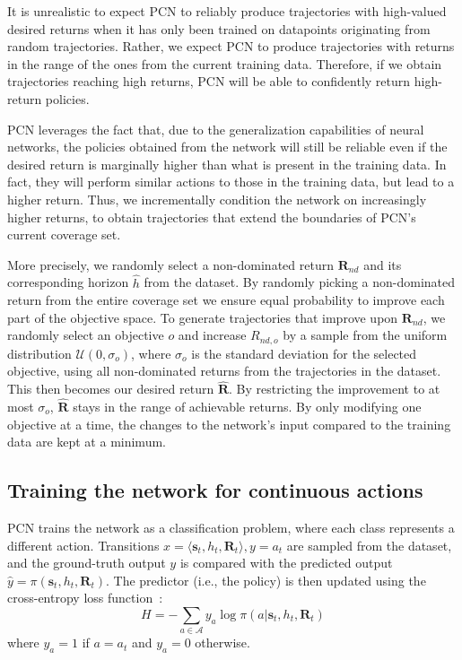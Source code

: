 \documentclass{article}
\renewcommand{\cite}[1]{\citep{#1}}
\newcommand{\mdpstate}{\mathbf{s}}
\newcommand{\momdpreturn}{\mathbf{R}}
\newcommand{\action}{a}
\begin{document}
It is unrealistic to expect PCN to reliably produce trajectories with high-valued desired returns when it has only been trained on datapoints originating from random trajectories. Rather, we expect PCN to produce trajectories with returns in the range of the ones from the current training data. Therefore, if we obtain trajectories reaching high returns, PCN will be able to confidently return high-return policies.

PCN leverages the fact that, due to the generalization capabilities of neural networks, the policies obtained from the network will still be reliable even if the desired return is marginally higher than what is present in the training data. In fact, they will perform similar actions to those in the training data, but lead to a higher return. Thus, we incrementally condition the network on increasingly higher returns, to obtain trajectories that extend the boundaries of PCN's current coverage set.

More precisely, we randomly select a non-dominated return $\mathbf{R}_{nd}$ and its corresponding horizon $\hat{h}$ from the dataset. By randomly picking a non-dominated return from the entire coverage set we ensure equal probability to improve each part of the objective space. To generate trajectories that improve upon $\mathbf{R}_{nd}$, we randomly select an objective $o$ and increase $R_{nd,o}$ by a sample from the uniform distribution $\mathcal{U}(0, \sigma_o)$, where $\sigma_o$ is the standard deviation for the selected objective, using all non-dominated returns from the trajectories in the dataset. This then becomes our desired return $\bm{\hat{R}}$. By restricting the improvement to at most $\sigma_o$, $\mathbf{\hat{R}}$ stays in the range of achievable returns. By only modifying one objective at a time, the changes to the network's input compared to the training data are kept at a minimum.

\subsection{Training the network for continuous actions}
\label{sec:pcn-continuous}

PCN trains the network as a classification problem, where each class represents a different action. Transitions $x= \langle \mdpstate_t, h_t, \momdpreturn_t \rangle, y=\action_t$ are sampled from the dataset, and the ground-truth output $y$ is compared with the predicted output $\hat{y}=\pi(\mdpstate_t, h_t, \momdpreturn_t)$. The predictor (i.e., the policy) is then updated using the cross-entropy loss function~\cite{shore1980axiomatic}:
\begin{equation}
    H = -\sum_{\action \in \mathcal{A}}{y_{\action} \log \pi(\action|\mdpstate_t,h_t,\momdpreturn_t)}
\end{equation}
where $y_\action = 1$ if $\action = \action_t$ and $y_\action = 0$ otherwise.
\end{document}
